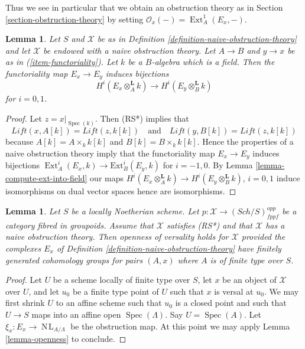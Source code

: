 \documentclass{stacks-project}
\theoremstyle{plain}
\newtheorem{lemma}[subsection]{Lemma}
\theoremstyle{definition}
\theoremstyle{remark}
\numberwithin{equation}{subsection}
\def\Spec{\mathop{\mathrm{Spec}}}
\def\Ext{\mathop{\mathrm{Ext}}\nolimits}
\def\Sch{\mathit{Sch}}
\def\NL{\mathop{N\!L}\nolimits}
\begin{document}
\noindent
Thus we see in particular that we obtain an obstruction theory
as in Section \ref{section-obstruction-theory} by setting
$\mathcal{O}_x( - ) = \Ext^1_A(E_x, -)$.

\begin{lemma}
\label{lemma-naive-obstruction-theory-qis}
Let $S$ and $\mathcal{X}$ be as in
Definition \ref{definition-naive-obstruction-theory}
and let $\mathcal{X}$ be endowed with a naive obstruction theory.
Let $A \to B$ and $y \to x$ be as in (\ref{item-functoriality}).
Let $k$ be a $B$-algebra which is a field. Then the functoriality
map $E_x \to E_y$ induces bijections
$$
H^i(E_x \otimes_A^{\mathbf{L}} k) \to H^i(E_y \otimes_B^{\mathbf{L}} k)
$$
for $i = 0, 1$.
\end{lemma}

\begin{proof}
Let $z = x|_{\Spec(k)}$. Then (RS*) implies that
$$
\textit{Lift}(x, A[k]) = \textit{Lift}(z, k[k])
\quad\text{and}\quad
\textit{Lift}(y, B[k]) = \textit{Lift}(z, k[k])
$$
because $A[k] = A \times_k k[k]$ and $B[k] = B \times_k k[k]$.
Hence the properties of a naive obstruction theory imply that the
functoriality map $E_x \to E_y$ induces bijections
$\Ext^i_A(E_x, k) \to \text{Ext}^i_B(E_y, k)$
for $i = -1, 0$. By Lemma \ref{lemma-compute-ext-into-field} our maps
$H^i(E_x \otimes_A^{\mathbf{L}} k) \to H^i(E_y \otimes_B^{\mathbf{L}} k)$,
$i = 0, 1$ induce isomorphisms on dual vector spaces hence are isomorphisms.
\end{proof}

\begin{lemma}
\label{lemma-naive-obstruction-theory-gives-openness}
Let $S$ be a locally Noetherian scheme. Let
$p : \mathcal{X} \to (\Sch/S)_{fppf}^{opp}$ be a category fibred in groupoids.
Assume that $\mathcal{X}$ satisfies (RS*)
and that $\mathcal{X}$ has a naive obstruction theory.
Then openness of versality holds for $\mathcal{X}$ provided the
complexes $E_x$ of Definition \ref{definition-naive-obstruction-theory}
have finitely generated cohomology groups for pairs $(A, x)$ where
$A$ is of finite type over $S$.
\end{lemma}

\begin{proof}
Let $U$ be a scheme locally of finite type over $S$, let $x$ be an object of
$\mathcal{X}$ over $U$, and let $u_0$ be a finite type point of $U$ such that
$x$ is versal at $u_0$. We may first shrink $U$ to an affine scheme such
that $u_0$ is a closed point and such that $U \to S$ maps into an affine
open $\Spec(\Lambda)$. Say $U = \Spec(A)$. Let
$\xi_x : E_x \to \NL_{A/\Lambda}$ be the obstruction map.
At this point we may apply Lemma \ref{lemma-openness} to conclude.
\end{proof}
\end{document}

